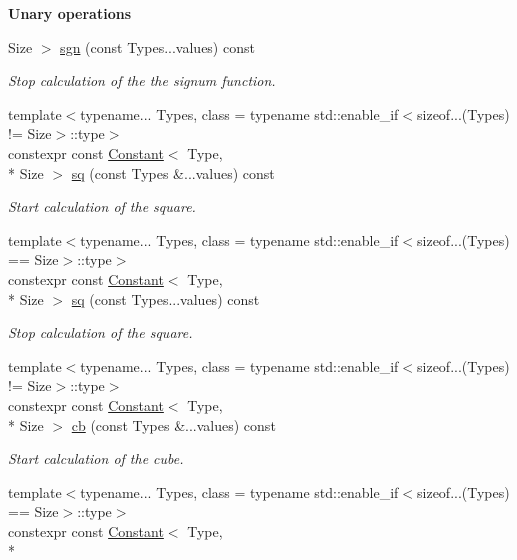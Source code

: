\begin{Indent}{\bf Unary operations}
\begin{DoxyCompactItemize}
Size $>$ \hyperlink{exceptionmagrathea_1_1Constant_a8309293f4bb0ed469bdb4f6f117a8423}{sgn} (const Types...\-values) const 
\begin{DoxyCompactList}\small\item\em Stop calculation of the the signum function. \end{DoxyCompactList}\item 
{\footnotesize template$<$typename... Types, class  = typename std\-::enable\-\_\-if$<$sizeof...(\-Types) != Size$>$\-::type$>$ }\\constexpr const \hyperlink{exceptionmagrathea_1_1Constant}{Constant}$<$ Type, \\*
Size $>$ \hyperlink{exceptionmagrathea_1_1Constant_ad073097e85c6e5596e7363a590130f63}{sq} (const Types \&...values) const 
\begin{DoxyCompactList}\small\item\em Start calculation of the square. \end{DoxyCompactList}\item 
{\footnotesize template$<$typename... Types, class  = typename std\-::enable\-\_\-if$<$sizeof...(\-Types) == Size$>$\-::type$>$ }\\constexpr const \hyperlink{exceptionmagrathea_1_1Constant}{Constant}$<$ Type, \\*
Size $>$ \hyperlink{exceptionmagrathea_1_1Constant_a07f0356d64639a13e39a416765011cd6}{sq} (const Types...\-values) const 
\begin{DoxyCompactList}\small\item\em Stop calculation of the square. \end{DoxyCompactList}\item 
{\footnotesize template$<$typename... Types, class  = typename std\-::enable\-\_\-if$<$sizeof...(\-Types) != Size$>$\-::type$>$ }\\constexpr const \hyperlink{exceptionmagrathea_1_1Constant}{Constant}$<$ Type, \\*
Size $>$ \hyperlink{exceptionmagrathea_1_1Constant_ae257caa8f49094934fd4e9380ec780af}{cb} (const Types \&...values) const 
\begin{DoxyCompactList}\small\item\em Start calculation of the cube. \end{DoxyCompactList}\item 
{\footnotesize template$<$typename... Types, class  = typename std\-::enable\-\_\-if$<$sizeof...(\-Types) == Size$>$\-::type$>$ }\\constexpr const \hyperlink{exceptionmagrathea_1_1Constant}{Constant}$<$ Type, \\*

\end{DoxyCompactItemize}
\end{Indent}

